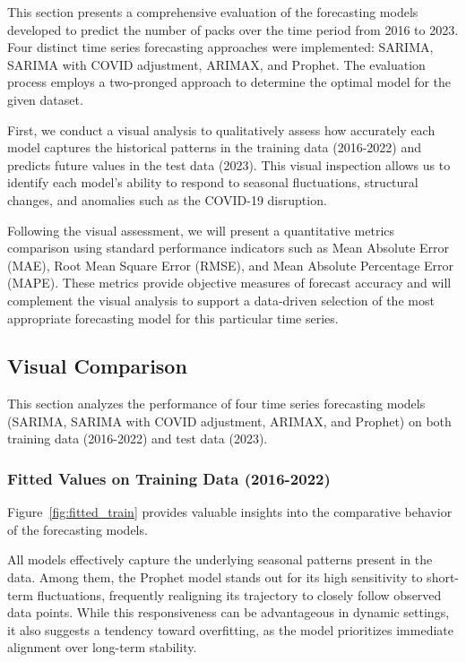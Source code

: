 \documentclass[10pt]{article}
\begin{document}
This section presents a comprehensive evaluation of the forecasting models developed to predict the number of packs over the time period from 2016 to 2023. Four distinct time series forecasting approaches were implemented: SARIMA, SARIMA with COVID adjustment, ARIMAX, and Prophet. The evaluation process employs a two-pronged approach to determine the optimal model for the given dataset.

First, we conduct a visual analysis to qualitatively assess how accurately each model captures the historical patterns in the training data (2016-2022) and predicts future values in the test data (2023). This visual inspection allows us to identify each model's ability to respond to seasonal fluctuations, structural changes, and anomalies such as the COVID-19 disruption.

Following the visual assessment, we will present a quantitative metrics comparison using standard performance indicators such as Mean Absolute Error (MAE), Root Mean Square Error (RMSE), and Mean Absolute Percentage Error (MAPE). These metrics provide objective measures of forecast accuracy and will complement the visual analysis to support a data-driven selection of the most appropriate forecasting model for this particular time series.


\subsection{Visual Comparison}

This section analyzes the performance of four time series forecasting models (SARIMA, SARIMA with COVID adjustment, ARIMAX, and Prophet) on both training data (2016-2022) and test data (2023).

\subsubsection{Fitted Values on Training Data (2016-2022)}
Figure~\ref{fig:fitted_train} provides valuable insights into the comparative behavior of the forecasting models.

All models effectively capture the underlying seasonal patterns present in the data. Among them, the Prophet model stands out for its high sensitivity to short-term fluctuations, frequently realigning its trajectory to closely follow observed data points. While this responsiveness can be advantageous in dynamic settings, it also suggests a tendency toward overfitting, as the model prioritizes immediate alignment over long-term stability.
\end{document}
